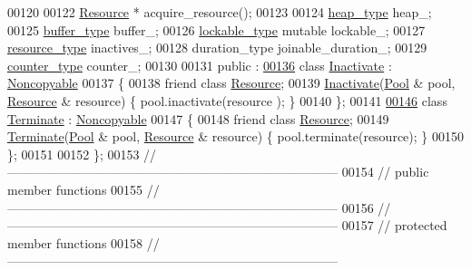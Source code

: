 \begin{DoxyCode}
00120 
00122     \hyperlink{classhryky_1_1thread_1_1_resource}{Resource} * acquire\_resource();
00123 
00124     \hyperlink{classhryky_1_1memory_1_1heap_1_1_base}{heap_type}                   heap\_;
00125     \hyperlink{classhryky_1_1_vector}{buffer_type}                 buffer\_;
00126     \hyperlink{classhryky_1_1exclusion_1_1_mutex}{lockable_type} \textcolor{keyword}{mutable}       lockable\_;
00127     \hyperlink{classhryky_1_1thread_1_1_resource}{resource_type}               inactives\_;
00128     duration\_type               joinable\_duration\_;
00129     \hyperlink{classhryky_1_1exclusion_1_1_counter}{counter_type}                counter\_;
00130 
00131 \textcolor{keyword}{public} :
\hypertarget{thread__pool_8h_source_l00136}{}\hyperlink{classhryky_1_1thread_1_1_pool_1_1_inactivate}{00136}     \textcolor{keyword}{class }\hyperlink{classhryky_1_1thread_1_1_pool_1_1_inactivate}{Inactivate} : \hyperlink{classhryky_1_1_noncopyable}{Noncopyable}
00137     \{
00138         \textcolor{keyword}{friend} \textcolor{keyword}{class }\hyperlink{classhryky_1_1thread_1_1_resource}{Resource};
00139         \hyperlink{classhryky_1_1thread_1_1_pool_1_1_inactivate}{Inactivate}(\hyperlink{classhryky_1_1thread_1_1_pool}{Pool} & pool, \hyperlink{classhryky_1_1thread_1_1_resource}{Resource} & resource) \{ pool.inactivate(resource
      ); \}
00140     \};
00141 
\hypertarget{thread__pool_8h_source_l00146}{}\hyperlink{classhryky_1_1thread_1_1_pool_1_1_terminate}{00146}     \textcolor{keyword}{class }\hyperlink{classhryky_1_1thread_1_1_pool_1_1_terminate}{Terminate} : \hyperlink{classhryky_1_1_noncopyable}{Noncopyable}
00147     \{
00148         \textcolor{keyword}{friend} \textcolor{keyword}{class }\hyperlink{classhryky_1_1thread_1_1_resource}{Resource};
00149         \hyperlink{classhryky_1_1thread_1_1_pool_1_1_terminate}{Terminate}(\hyperlink{classhryky_1_1thread_1_1_pool}{Pool} & pool, \hyperlink{classhryky_1_1thread_1_1_resource}{Resource} & resource) \{ pool.terminate(resource);
       \}
00150     \};
00151 
00152 \};
00153 \textcolor{comment}{//
      ------------------------------------------------------------------------------}
00154 \textcolor{comment}{// public member functions}
00155 \textcolor{comment}{//
      ------------------------------------------------------------------------------}
00156 \textcolor{comment}{//
      ------------------------------------------------------------------------------}
00157 \textcolor{comment}{// protected member functions}
00158 \textcolor{comment}{//
      ------------------------------------------------------------------------------}

\end{DoxyCode}
